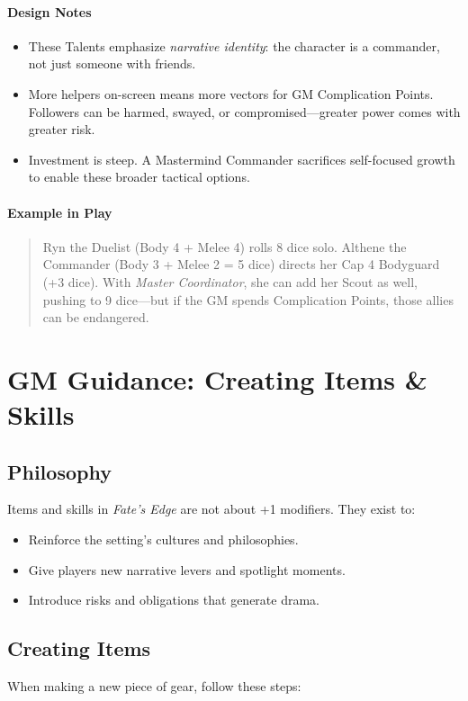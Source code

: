 \documentclass[12pt]{article}
\begin{document}
\paragraph{Design Notes}
\begin{itemize}
  \item These Talents emphasize \emph{narrative identity}: the character is a commander, not just someone with friends.
  \item More helpers on-screen means more vectors for GM Complication Points. Followers can be harmed, swayed, or compromised—greater power comes with greater risk.
  \item Investment is steep. A Mastermind Commander sacrifices self-focused growth to enable these broader tactical options.
\end{itemize}

\paragraph{Example in Play}
\begin{quote}
Ryn the Duelist (Body 4 + Melee 4) rolls 8 dice solo.
Althene the Commander (Body 3 + Melee 2 = 5 dice) directs her Cap 4 Bodyguard (+3 dice). With \emph{Master Coordinator}, she can add her Scout as well, pushing to 9 dice—but if the GM spends Complication Points, those allies can be endangered.
\end{quote}

\section*{GM Guidance: Creating Items \& Skills}

\subsection*{Philosophy}
Items and skills in \textit{Fate’s Edge} are not about +1 modifiers.  
They exist to:
\begin{itemize}
  \item Reinforce the setting’s cultures and philosophies.
  \item Give players new narrative levers and spotlight moments.
  \item Introduce risks and obligations that generate drama.
\end{itemize}

\subsection*{Creating Items}
When making a new piece of gear, follow these steps:
\end{document}
